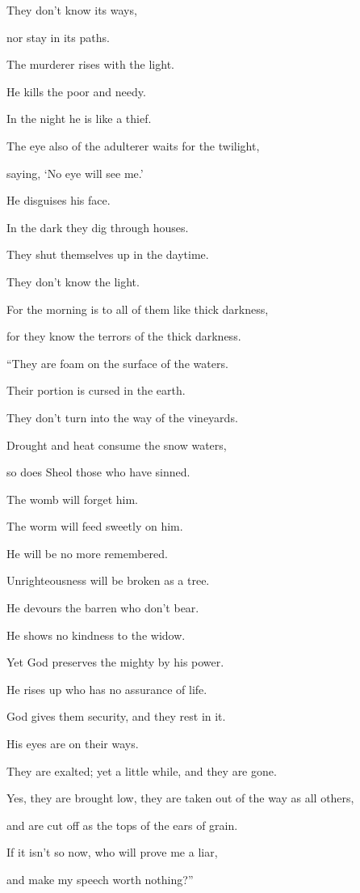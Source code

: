 {\par }{\QB They don’t know its ways,
\par }{\QB nor stay in its paths.
\par }{\Q {}The murderer rises with the light.
\par }{\QB He kills the poor and needy.
\par }{\QB In the night he is like a thief.
\par }{\Q {}The eye also of the adulterer waits for the twilight,
\par }{\QB saying, ‘No eye will see me.’
\par }{\QB He disguises his face.
\par }{\Q {}In the dark they dig through houses.
\par }{\QB They shut themselves up in the daytime.
\par }{\QB They don’t know the light.
\par }{\Q {}For the morning is to all of them like thick darkness,
\par }{\QB for they know the terrors of the thick darkness.
\par }{\BB \par }{\Q {}“They are foam on the surface of the waters.
\par }{\QB Their portion is cursed in the earth.
\par }{\QB They don’t turn into the way of the vineyards.
\par }{\Q {}Drought and heat consume the snow waters,
\par }{\QB so does Sheol those who have sinned.
\par }{\Q {}The womb will forget him.
\par }{\QB The worm will feed sweetly on him.
\par }{\QB He will be no more remembered.
\par }{\QB Unrighteousness will be broken as a tree.
\par }{\Q {}He devours the barren who don’t bear.
\par }{\QB He shows no kindness to the widow.
\par }{\Q {}Yet God preserves the mighty by his power.
\par }{\QB He rises up who has no assurance of life.
\par }{\Q {}God gives them security, and they rest in it.
\par }{\QB His eyes are on their ways.
\par }{\Q {}They are exalted; yet a little while, and they are gone.
\par }{\QB Yes, they are brought low, they are taken out of the way as all others,
\par }{\QB and are cut off as the tops of the ears of grain.
\par }{\Q {}If it isn’t so now, who will prove me a liar,
\par }{\QB and make my speech worth nothing?”
\par }{\BB \par }
